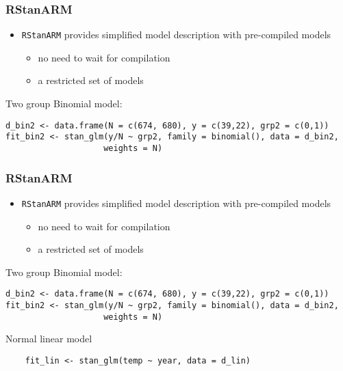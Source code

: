 \documentclass[finnish,english,t]{beamer}
\begin{document}
\begin{frame}[fragile]
  \frametitle{RStanARM}

  \begin{itemize}
  \item \texttt{RStanARM} provides simplified model description with
    pre-compiled models
    \begin{itemize}
    \item no need to wait for compilation
    \item a restricted set of models
    \end{itemize}
  \end{itemize}

Two group Binomial model:
  {\scriptsize
\begin{lstlisting}
d_bin2 <- data.frame(N = c(674, 680), y = c(39,22), grp2 = c(0,1))
fit_bin2 <- stan_glm(y/N ~ grp2, family = binomial(), data = d_bin2,
                    weights = N)
\end{lstlisting}
  }

    
\end{frame} 

\begin{frame}[fragile]
  \frametitle{RStanARM}

  \begin{itemize}
  \item \texttt{RStanARM} provides simplified model description with
    pre-compiled models
    \begin{itemize}
    \item no need to wait for compilation
    \item a restricted set of models
    \end{itemize}
  \end{itemize}

Two group Binomial model:
  {\scriptsize
\begin{lstlisting}
d_bin2 <- data.frame(N = c(674, 680), y = c(39,22), grp2 = c(0,1))
fit_bin2 <- stan_glm(y/N ~ grp2, family = binomial(), data = d_bin2,
                    weights = N)
\end{lstlisting}
  }
    Normal linear model
  {\scriptsize
\begin{lstlisting}
    fit_lin <- stan_glm(temp ~ year, data = d_lin)
\end{lstlisting}
  }

    
\end{frame} 
\end{document}
